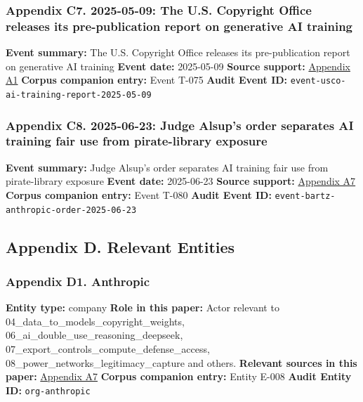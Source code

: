 \documentclass[
  american,
  11pt,
  letterpaper,
]{article}
\begin{document}
\subsubsection{Appendix C7. 2025-05-09: The U.S. Copyright Office
releases its pre-publication report on generative AI
training}\label{ch-04-appendix-c7-2025-05-09-the-u-s-copyright-office-releases-its-pre-publication-report-on-generative-ai-training}

\textbf{Event summary:} The U.S. Copyright Office releases its
pre-publication report on generative AI training \textbf{Event date:}
2025-05-09 \textbf{Source support:}
\hyperref[ch-04-appendix-a1-copyright-and-artificial-intelligence-part-3-generative-ai-training-pre-publication-version]{Appendix
A1} \textbf{Corpus companion entry:} Event T-075 \textbf{Audit Event
ID:} \texttt{event-usco-ai-training-report-2025-05-09}

\subsubsection{Appendix C8. 2025-06-23: Judge Alsup's order separates AI
training fair use from pirate-library
exposure}\label{ch-04-appendix-c8-2025-06-23-judge-alsup-s-order-separates-ai-training-fair-use-from-pirate-library-exposure}

\textbf{Event summary:} Judge Alsup's order separates AI training fair
use from pirate-library exposure \textbf{Event date:} 2025-06-23
\textbf{Source support:}
\hyperref[ch-04-appendix-a7-bartz-et-al-v-anthropic-pbc-order-on-fair-use]{Appendix
A7} \textbf{Corpus companion entry:} Event T-080 \textbf{Audit Event
ID:} \texttt{event-bartz-anthropic-order-2025-06-23}

\subsection{Appendix D. Relevant
Entities}\label{appendix-d.-relevant-entities-4}

\subsubsection{Appendix D1.
Anthropic}\label{ch-04-appendix-d1-anthropic}

\textbf{Entity type:} company \textbf{Role in this paper:} Actor
relevant to 04\_data\_to\_models\_copyright\_weights,
06\_ai\_double\_use\_reasoning\_deepseek,
07\_export\_controls\_compute\_defense\_access,
08\_power\_networks\_legitimacy\_capture and others. \textbf{Relevant
sources in this paper:}
\hyperref[ch-04-appendix-a7-bartz-et-al-v-anthropic-pbc-order-on-fair-use]{Appendix
A7} \textbf{Corpus companion entry:} Entity E-008 \textbf{Audit Entity
ID:} \texttt{org-anthropic}
\end{document}

